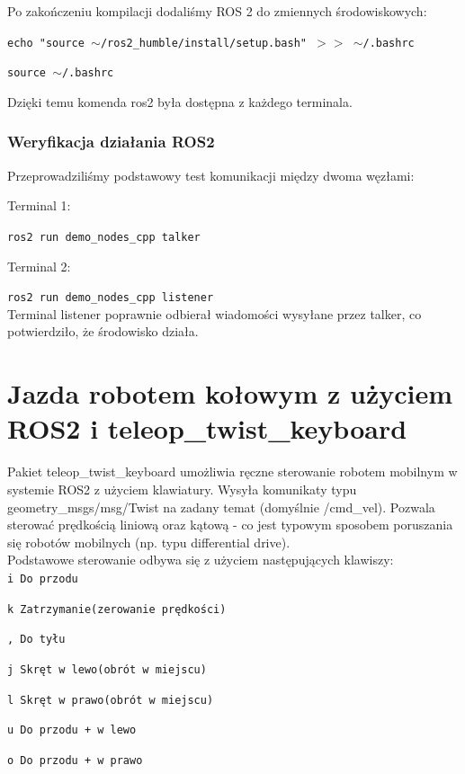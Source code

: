 \documentclass[12pt]{article}
\begin{document}
Po zakończeniu kompilacji dodaliśmy ROS 2 do zmiennych środowiskowych:

\texttt{echo "source $\sim$/ros2\_humble/install/setup.bash" $>>$ $\sim$/.bashrc}

\texttt{source $\sim$/.bashrc}

\noindent Dzięki temu komenda ros2 była dostępna z każdego terminala.

\subsubsection{Weryfikacja działania ROS2 }

Przeprowadziliśmy podstawowy test komunikacji między dwoma węzłami:

Terminal 1:

\texttt{ros2 run demo\_nodes\_cpp talker}


Terminal 2:

\texttt{ros2 run demo\_nodes\_cpp listener}
\\
Terminal listener poprawnie odbierał wiadomości wysyłane przez talker, co potwierdziło, że środowisko działa.



\section{Jazda robotem kołowym z użyciem ROS2 i teleop\_twist\_keyboard}

\noindent Pakiet teleop\_twist\_keyboard umożliwia ręczne sterowanie robotem mobilnym w systemie ROS2 z użyciem klawiatury. Wysyła komunikaty typu geometry\_msgs/msg/Twist na zadany temat (domyślnie /cmd\_vel). Pozwala sterować prędkością liniową oraz kątową - co jest typowym sposobem poruszania się robotów mobilnych (np. typu differential drive).\\

\noindent Podstawowe sterowanie odbywa się z użyciem następujących klawiszy:\\

\texttt{i  Do przodu}

\texttt{k  Zatrzymanie(zerowanie prędkości)}

\texttt{,  Do tyłu}

\texttt{j  Skręt w lewo(obrót w miejscu)}

\texttt{l  Skręt w prawo(obrót w miejscu)}

\texttt{u Do przodu + w lewo}

\texttt{o  Do przodu + w prawo}
\end{document}
